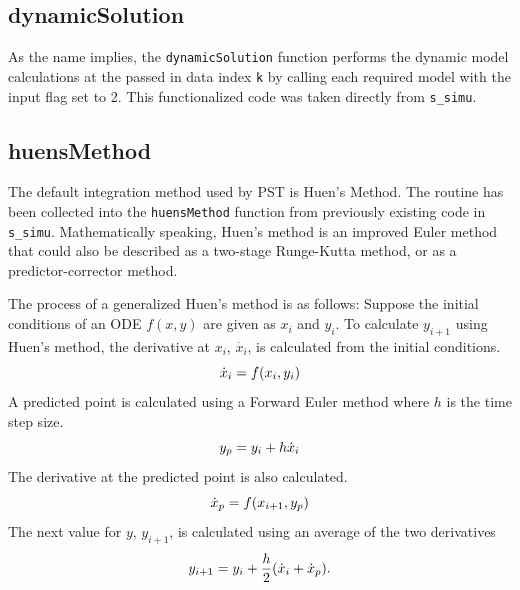 \subsection{dynamicSolution}  
As the name implies, the \verb|dynamicSolution| function performs the dynamic model calculations at  the passed in data index \verb|k| by calling each required model with the input flag set to 2.
This functionalized code was taken directly from \verb|s_simu|.


\subsection{huensMethod}  
The default integration method used by PST is Huen's Method.
The routine has been collected into the \verb|huensMethod| function from previously existing code in \verb|s_simu|.
Mathematically speaking, Huen's method is an improved Euler method that could also be described as a two-stage Runge-Kutta method, or as a predictor-corrector method.

The process of a generalized Huen's method is as follows:
Suppose the initial conditions of an ODE $f(x,y)$ are given as $x_i$ and $y_i$.
To calculate $y_{i+1}$ using Huen's method, the derivative at $x_i$, $\dot{x_i}$, is calculated from the initial conditions.
\begin{equation}{\label{eq: huens1} }
\dot{x}_i = f(x_i, y_i)
\end{equation} 
\noindent A predicted point is calculated using a Forward Euler method where $h$ is the time step size.
\begin{equation}{\label{eq: huens2} }
y_p = y_i + h \dot{x}_i
\end{equation} 
\noindent The derivative at the predicted point is also calculated.
\begin{equation}{\label{eq: huens3} }
\dot{x}_p = f(x_{i+1}, y_p)
\end{equation} 
\noindent The next value for $y$, $y_{i+1}$, is calculated using an average of the two derivatives
\begin{equation}{\label{eq: huens4} }
y_{i+1} = y_i + \frac{h}{2}( \dot{x}_i + \dot{x}_p ).
\end{equation} 


